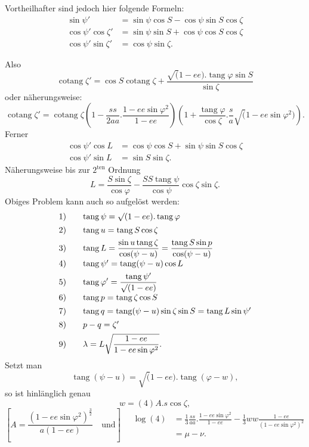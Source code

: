 Vortheilhafter sind jedoch hier folgende Formeln:
\[
\begin{aligned}
\sin\psi'&=\sin\psi\cos S-\cos\psi\sin S\cos\zeta\\
\cos\psi'\cos\zeta'&=\sin\psi\sin S+\cos\psi\cos S\cos\zeta\\
\cos\psi'\sin\zeta'&=\cos\psi\sin\zeta.
\end{aligned}
\]

\clearpage
\noindent{}\makebox[12mm][r]{}\par\medskip
Also
\[
\operatorname{cotang}\zeta'=\cos S\operatorname{cotang}\zeta
+\frac{\surd(1-ee).\operatorname{tang}\varphi\sin S}{\sin\zeta}
\]
\noindent oder näherungsweise:
\[
\operatorname{cotang}\zeta'=\operatorname{cotang}\zeta
\left(1-\frac{ss}{2aa}.\frac{1-ee\sin\varphi^2}{1-ee}\right)
\left(1+\frac{\operatorname{tang}\varphi}{\cos\zeta}.\frac sa\surd(1-ee\sin\varphi^2)\right).
\]
\noindent Ferner
\[
\begin{aligned}
\cos\psi'\cos L&=\cos\psi\cos S+\sin\psi\sin S\cos\zeta\\
\cos\psi'\sin L&=\sin S\sin\zeta.
\end{aligned}
\]
\noindent Näherungsweise bis zur \(2^{\text{ten}}\) Ordnung
\[
L=\frac{S\sin\zeta}{\cos\varphi}
-\frac{SS\operatorname{tang}\psi}{\cos\psi}\cos\zeta\sin\zeta.
\]
Obiges Problem kann auch so aufgelöst werden:
\[
\begin{array}{r@{\qquad}l}
1)&\operatorname{tang}\psi=\surd(1-ee).\operatorname{tang}\varphi\\[1ex]
2)&\operatorname{tang}u=\operatorname{tang}S\cos\zeta\\[1ex]
3)&\displaystyle\operatorname{tang}L=\frac{\sin u\operatorname{tang}\zeta}{\cos(\psi-u)}
=\frac{\operatorname{tang}S\sin p}{\cos(\psi-u)}\\[1.5ex]
4)&\operatorname{tang}\psi'=\operatorname{tang}(\psi-u)\cos L\\[1ex]
5)&\displaystyle\operatorname{tang}\varphi'=\frac{\operatorname{tang}\psi'}{\surd(1-ee)}\\[1.5ex]
6)&\operatorname{tang}p=\operatorname{tang}\zeta\cos S\\[1ex]
7)&\operatorname{tang}q=\operatorname{tang}(\psi-u)\sin\zeta\sin S=\operatorname{tang}L\sin\psi'\\[1ex]
8)&p-q=\zeta'\\[1ex]
9)&\displaystyle\lambda=L\sqrt{\frac{1-ee}{1-ee\sin\varphi^2}}.
\end{array}
\]
Setzt man
\[
\operatorname{tang}(\psi-u)=\surd(1-ee).\operatorname{tang}(\varphi-w),
\]
\noindent so ist hinlänglich genau
\[
w=(4)A.s\cos\zeta,
\]
\begingroup\small
\[
\left[A=\frac{(1-ee\sin\varphi^2)^{\frac32}}{a(1-ee)}\quad\text{und}\right]
\quad\begin{aligned}
\log(4)&=\tfrac13\frac{ss}{aa}.\frac{1-ee\sin\varphi^2}{1-ee}
-\tfrac13ww\frac{1-ee}{(1-ee\sin\varphi^2)^2}\\
&=\mu-\nu.
\end{aligned}
\]
\endgroup

